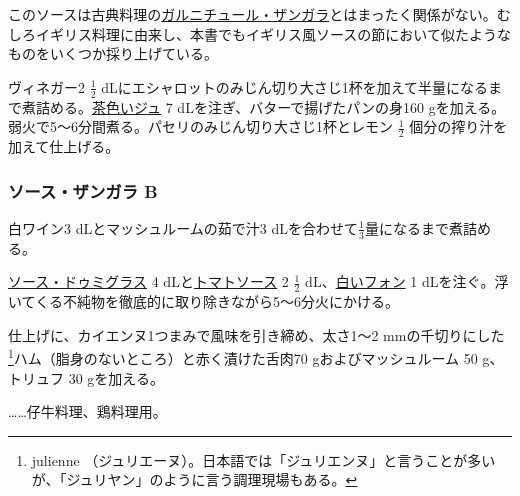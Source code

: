 \begin{recette}

 

このソースは古典料理の\protect\hyperlink{garniture-zingara}{ガルニチュール・ザンガラ}とはまったく関係がない。むしろイギリス料理に由来し、本書でもイギリス風ソースの節において似たようなものをいくつか採り上げている。

ヴィネガー2 \(\frac{1}{2}\)
dLにエシャロットのみじん切り大さじ1杯を加えて半量になるまで煮詰める。\protect\hyperlink{jus-de-veau-lie}{茶色いジュ}
7 dLを注ぎ、バターで揚げたパンの身160
gを加える。弱火で5〜6分間煮る。パセリのみじん切り大さじ1杯とレモン
\(\frac{1}{2}\) 個分の搾り汁を加えて仕上げる。

\atoaki{}

\hypertarget{sauce-zingara-b}{%
\subsubsection{ソース・ザンガラ B}\label{sauce-zingara-b}}


 

白ワイン3 dLとマッシュルームの茹で汁3
dLを合わせて\(\frac{1}{3}\)量になるまで煮詰める。

\protect\hyperlink{sauce-demi-glace}{ソース・ドゥミグラス} 4
dLと\protect\hyperlink{sauce-tomate}{トマトソース} 2 \(\frac{1}{2}\)
dL、\protect\hyperlink{fonds-blanc}{白いフォン} 1
dLを注ぐ。浮いてくる不純物を徹底的に取り除きながら5〜6分火にかける。

仕上げに、カイエンヌ1つまみで風味を引き締め、太さ1〜2 mmの千切りにした
\footnote{julienne
  （ジュリエーヌ）。日本語では「ジュリエンヌ」と言うことが多いが、「ジュリヤン」のように言う調理現場もある。}ハム（脂身のないところ）と赤く漬けた舌肉70
gおよびマッシュルーム 50 g、トリュフ 30 gを加える。

\ldots{}\ldots{}仔牛料理、鶏料理用。

\end{recette}
